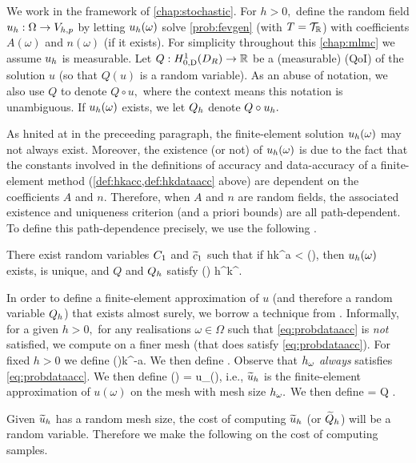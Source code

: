 We work in the framework of \cref{chap:stochastic}. For $h>0,$ define the random field $u_{h}:\Omega \rightarrow V_{h,p}$ by letting $u_{h}(\omega)$ solve \cref{prob:fevgen} (with $T = \mathcal T_{\mathbb R}$) with coefficients $A(\omega)$ and $n(\omega)$ (if it exists). For simplicity throughout this \cref{chap:mlmc} we assume $u_{h}$ is measurable. Let $Q:\HozDDR\rightarrow\RR$ be a (measurable)  (QoI) of the solution $u$ (so that $Q(u)$ is a random variable). As an abuse of notation, we also use $Q$ to denote $Q \circ u,$ where the context means this notation is unambiguous. If $u_{h}(\omega)$ exists, we let $Q_{h}$ denote $Q \circ u_{h}.$

As hnited at in the preceeding paragraph, the finite-element solution $u_{h}(\omega)$ may not always exist. Moreover, the existence (or not) of $u_{h}(\omega)$ is due to the fact that the constants involved in the definitions of accuracy and data-accuracy of a finite-element method (\cref{def:hkacc,def:hkdataacc} above) are dependent on the coefficients $A$ and $n$. Therefore, when $A$ and $n$ are random fields, the associated existence and uniqueness criterion (and a priori bounds) are all path-dependent. To define this path-dependence precisely, we use the following .

\label{def:probdataacc}
There exist random variables $C_{1}$ and $\widetilde{c}_{1}$ such that if
\beq\label{eq:probdataacc}
hk^a < \Co(\omega),
\eeq
then $u_{h}(\omega)$ exists, is unique, and $Q$ and $Q_{h}$ satisfy
\beqs
{} \leq \cotilde(\omega) h^\alpha k^\sigma \Cfg.
\eeqs
\eas

In order to define a finite-element approximation of $u$ (and therefore a random variable $Q_{h}$) that exists almost surely, we borrow a technique from \cite{GrPaSc:19}. Informally, for a given $h>0,$ for any realisations $\omega \in \Omega$ such that \cref{eq:probdataacc} is \emph{not} satisfied, we compute on a finer mesh (that does satisfy \cref{eq:probdataacc}). For fixed $h>0$ we define
\beq\label{eq:hmaxomega}
\hmaxomega \de \Co(\omega)k^{-a}.
\eeq
We then define
\beq\label{eq:homega}
\homega \de \min{}.
\eeq
Observe that $h_{\omega}$ \emph{always} satisfies \cref{eq:probdataacc}. We then define
\beqs
\uhtilde(\omega) = u_{\homega}(\omega),
\eeqs
i.e., $\widetilde{u}_{h}$ is the finite-element approximation of $u(\omega)$ on the mesh with mesh size $h_{\omega}.$ We then define
\beq\label{eq:Qhtilde}
\Qhtilde = Q \circ \uhtilde.
\eeq

Given $\widetilde{u}_{h}$ has a random mesh size, the cost of computing $\widetilde{u}_{h}$ (or $\widetilde{Q}_{h}$) will be a random variable. Therefore we make the following  on the cost of computing samples.

